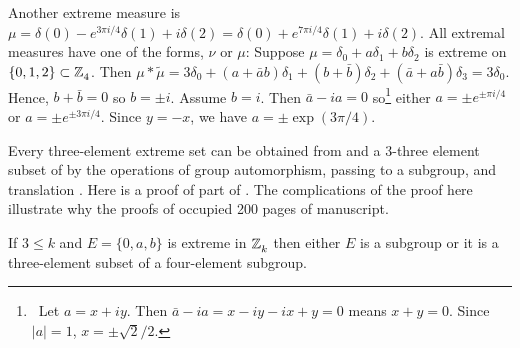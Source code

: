 Another extreme measure is $\mu=\delta(0) - e^{3\pi i/4}\delta(1) + i\delta(2)
=\delta(0) + e^{7\pi i/4}\delta(1) + i\delta(2)$.
All extremal measures have one of the forms, $\nu$ or $\mu$:
Suppose $\mu=\delta_0+a\delta_1+b\delta_2$ is extreme on $\{0,1,2\}\subset \texttt{$\mathbb Z_{4}^{\,}$}$. Then
$\mu*\tilde\mu=3\delta_0+(a+\bar ab)\delta_1 + (b+\bar b)\delta_2 +
(\bar a+a\bar b)\delta_3=3\delta_0$.
Hence, $b+\bar b=0$ so $b=\pm i$. Assume $b=i$. Then 
$\bar a-ia=0$ so\footnote{\ 
Let $a= x+iy$. Then $\bar{a}-ia= x-iy-ix+y=0$ means $x+y=0$. Since 
$|a|=1$, $x= \pm\sqrt2/2$.}
either $a=\pm e^{\pm\pi i/4}$ or $a =\pm e^{\pm 3\pi i/4}$. 
Since $y=-x$, we have $a=\pm \exp(3\pi /4).$


\medskip
Every three-element extreme set can be obtained from  and a 3-three element subset of 
by the operations of group automorphism, passing to a subgroup, and translation
\cite[3.1(ii)]{MR627683}. Here is a proof of part of \cite[3.1(ii)]{MR627683}. 
The complications of the proof here illustrate
 why the proofs
of \cite[3.1-3.3]{MR627683} occupied 200 pages of manuscript.

  
\begin{prop}[\cite{MR627683}]\label{prop3eltsets} 
If  $3\le k$ and $E=\{0,a,b\}$ is extreme in $\texttt{$\mathbb Z_{k}^{\,}$}$ then either $E$ is a subgroup or it is a three-element
subset of a four-element subgroup.
\end{prop}

